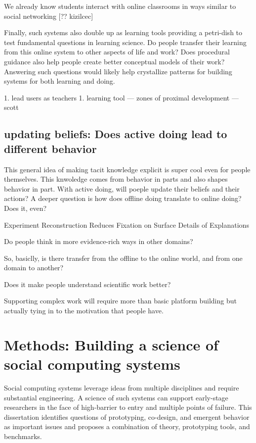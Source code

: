 We already know students interact with online classrooms in ways similar to social networking [?? kizilcec]

Finally, such systems also double up as learning tools providing a petri-dish to test fundamental questions in learning science. Do people transfer their learning from this online system to other aspects of life and work? Does procedural guidance also help people create better conceptual models of their work? Answering such questions would likely help crystallize patterns for building systems for both learning and doing.

1. lead users as teachers
    1. learning tool — zones of proximal development — scott


\subsection{updating beliefs: Does active doing lead to different behavior}
This general idea of making tacit knowledge explicit is super cool even for people themselves. This knwoledge comes from behavior in parts and also shapes behavior in part. With active doing, will poeple update their beliefs and their actions? A deeper question is how does offline doing translate to online doing? Does it, even?

Experiment Reconstruction Reduces Fixation on Surface Details of Explanations

Do people think in more evidence-rich ways in other domains?

So, basiclly, is there transfer from the offline to the online world, and from one domain to another?

Does it make people understand scientific work better?

Supporting complex work will require more than basic platform building but actually tying in to the motivation that people have.


\section{Methods: Building a science of social computing systems}

Social computing systems leverage ideas from multiple disciplines and require substantial engineering. A science of such systems can support early-stage researchers in the face of high-barrier to entry and multiple points of failure. This dissertation identifies questions of prototyping, co-design, and emergent behavior as important issues and proposes a combination of theory, prototyping tools, and benchmarks. 

